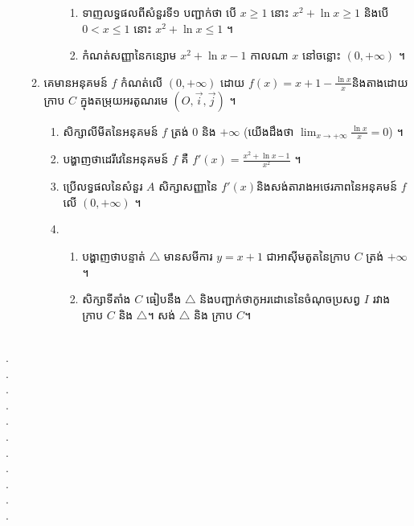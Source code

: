 \documentclass{officialexam}
\begin{document}
\begin{enumerate}[I]
\begin{enumerate}[A]
\begin{enumerate}[1]
\begin{enumerate}[k]
					\item ទាញលទ្ធផលពីសំនួរទី១ បញ្ជាក់ថា បើ $x\geq1$ នោះ $x^2+\ln x\geq1$ និងបើ $0<x\leq1$ នោះ $x^2+\ln x\leq1$ ។
					\item កំណត់សញ្ញានៃកន្សោម $x^2+\ln x-1$ កាលណា $x$ នៅចន្លោះ $\left(0,+\infty\right)$ ។
				\end{enumerate}
			\end{enumerate}
			\item គេមានអនុគមន៍ $f$ កំណត់លើ $\left(0, +\infty\right)$ ដោយ $f(x)=x+1-\frac{\ln x}{x}$​និងតាងដោយក្រាប $C$ ក្នុងតម្រុយអរតូណរមេ $\left(O, \vec{i}, \vec{j}\right)$ ។
			\begin{enumerate}[1]
				\item សិក្សាលីមីតនៃអនុគមន៍ $f$ ត្រង់ $0$ និង $+\infty$ (យើងដឹងថា $\lim_{x\to+\infty}\frac{\ln x}{x}=0$) ។
				\item បង្ហាញថាដេរីវេនៃអនុគមន៍ $f$ គឺ $f'(x)=\frac{x^2+\ln x-1}{x^2}$ ។
				\item ប្រើលទ្ធផលនៃសំនួរ $A$ សិក្សាសញ្ញានៃ $f'(x)$​និងសង់តារាងអថេរភាពនៃអនុគមន៍ $f$ លើ $\left(0, +\infty\right)$ ។
				\item \begin{enumerate}[k]
					\item បង្ហាញថាបន្ទាត់ $\bigtriangleup$ មានសមីការ $y=x+1$ ជាអាស៊ីមតូតនៃក្រាប $C$ ត្រង់ $+\infty$ ។
					\item សិក្សាទីតាំង $C$ ធៀបនឹង $\bigtriangleup$ និងបញ្ជាក់ថាកូអរដោនេនៃចំណុចប្រសព្វ $I$ រវាងក្រាប $C$ និង $\bigtriangleup$។ សង់ $\bigtriangleup$ និង ក្រាប $C$។
				\end{enumerate} 
			\end{enumerate}
		\end{enumerate}
	\end{enumerate}
\borderline{\bigg[ចម្លើយ\bigg]}\\
{\color{white}.}\dotfill\\
{\color{white}.}\dotfill\\
{\color{white}.}\dotfill
\\
{\color{white}.}\dotfill\\
{\color{white}.}\dotfill\\
{\color{white}.}\dotfill
\\
{\color{white}.}\dotfill\\
{\color{white}.}\dotfill\\
{\color{white}.}\dotfill
\\
{\color{white}.}\dotfill\\
{\color{white}.}\dotfill\\
\end{document}

